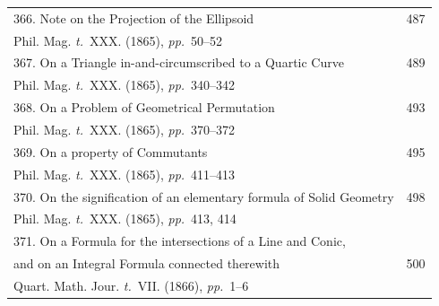 \documentclass[11pt,a4paper]{article}
\newcommand{\tome}{\textit{t.}}
\newcommand{\pages}{\textit{pp.}}
\begin{document}
\begin{longtable}{p{4.5in}r}
366. Note on the Projection of the Ellipsoid & 487 \\[-0.3em]
\multicolumn{2}{l}{\quad\small Phil. Mag. \tome~XXX. (1865), \pages~50--52} \\[0.5em]

367. On a Triangle in-and-circumscribed to a Quartic Curve & 489 \\[-0.3em]
\multicolumn{2}{l}{\quad\small Phil. Mag. \tome~XXX. (1865), \pages~340--342} \\[0.5em]

368. On a Problem of Geometrical Permutation & 493 \\[-0.3em]
\multicolumn{2}{l}{\quad\small Phil. Mag. \tome~XXX. (1865), \pages~370--372} \\[0.5em]

369. On a property of Commutants & 495 \\[-0.3em]
\multicolumn{2}{l}{\quad\small Phil. Mag. \tome~XXX. (1865), \pages~411--413} \\[0.5em]

370. On the signification of an elementary formula of Solid Geometry & 498 \\[-0.3em]
\multicolumn{2}{l}{\quad\small Phil. Mag. \tome~XXX. (1865), \pages~413, 414} \\[0.5em]

\multicolumn{2}{l}{371. On a Formula for the intersections of a Line and Conic,} \\[-0.3em]
\quad and on an Integral Formula connected therewith & 500 \\[-0.3em]
\multicolumn{2}{l}{\quad\small Quart. Math. Jour. \tome~VII. (1866), \pages~1--6} \\[0.5em]
\end{longtable}

\clearpage
\end{document}
